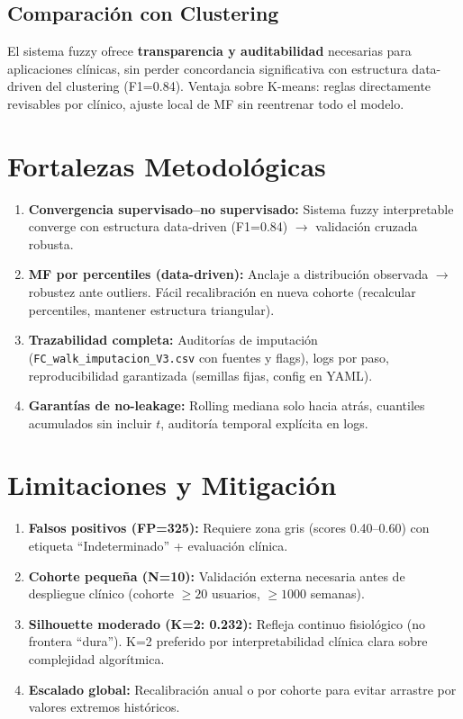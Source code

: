 \documentclass[12pt,a4paper,twoside]{article}
\begin{document}
\subsection{Comparación con Clustering}

El sistema fuzzy ofrece \textbf{transparencia y auditabilidad} necesarias para aplicaciones clínicas, sin perder concordancia significativa con estructura data-driven del clustering (F1=0.84). Ventaja sobre K-means: reglas directamente revisables por clínico, ajuste local de MF sin reentrenar todo el modelo.


\section{Fortalezas Metodológicas}

\begin{enumerate}
    \item \textbf{Convergencia supervisado--no supervisado:} Sistema fuzzy interpretable converge con estructura data-driven (F1=0.84) $\rightarrow$ validación cruzada robusta.
    \item \textbf{MF por percentiles (data-driven):} Anclaje a distribución observada $\rightarrow$ robustez ante outliers. Fácil recalibración en nueva cohorte (recalcular percentiles, mantener estructura triangular).
    \item \textbf{Trazabilidad completa:} Auditorías de imputación (\texttt{FC\_walk\_imputacion\_V3.csv} con fuentes y flags), logs por paso, reproducibilidad garantizada (semillas fijas, config en YAML).
    \item \textbf{Garantías de no-leakage:} Rolling mediana solo hacia atrás, cuantiles acumulados sin incluir $t$, auditoría temporal explícita en logs.
\end{enumerate}

\section{Limitaciones y Mitigación}

\begin{enumerate}
    \item \textbf{Falsos positivos (FP=325):} Requiere zona gris (scores 0.40--0.60) con etiqueta ``Indeterminado'' + evaluación clínica.
    \item \textbf{Cohorte pequeña (N=10):} Validación externa necesaria antes de despliegue clínico (cohorte $\geq 20$ usuarios, $\geq 1000$ semanas).
    \item \textbf{Silhouette moderado (K=2: 0.232):} Refleja continuo fisiológico (no frontera ``dura''). K=2 preferido por interpretabilidad clínica clara sobre complejidad algorítmica.
    \item \textbf{Escalado global:} Recalibración anual o por cohorte para evitar arrastre por valores extremos históricos.
\end{enumerate}
\end{document}
